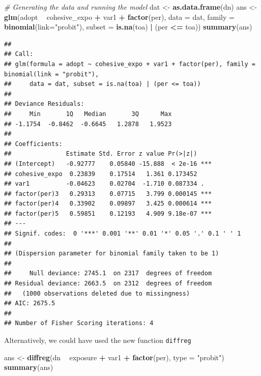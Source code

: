 \documentclass[]{book}
\newenvironment{Shaded}{\begin{snugshade}}{\end{snugshade}}
\newcommand{\CommentTok}[1]{\textcolor[rgb]{0.56,0.35,0.01}{\textit{#1}}}
\newcommand{\DataTypeTok}[1]{\textcolor[rgb]{0.13,0.29,0.53}{#1}}
\newcommand{\KeywordTok}[1]{\textcolor[rgb]{0.13,0.29,0.53}{\textbf{#1}}}
\newcommand{\NormalTok}[1]{#1}
\newcommand{\OperatorTok}[1]{\textcolor[rgb]{0.81,0.36,0.00}{\textbf{#1}}}
\newcommand{\StringTok}[1]{\textcolor[rgb]{0.31,0.60,0.02}{#1}}
\begin{document}
\begin{itemize}
\begin{Shaded}
\begin{Highlighting}[]
\CommentTok{# Generating the data and running the model}
\NormalTok{dat <-}\StringTok{ }\KeywordTok{as.data.frame}\NormalTok{(dn)}
\NormalTok{ans <-}\StringTok{ }\KeywordTok{glm}\NormalTok{(adopt }\OperatorTok{~}\StringTok{ }\NormalTok{cohesive_expo }\OperatorTok{+}\StringTok{ }\NormalTok{var1 }\OperatorTok{+}\StringTok{ }\KeywordTok{factor}\NormalTok{(per),}
           \DataTypeTok{data =}\NormalTok{ dat,}
           \DataTypeTok{family =} \KeywordTok{binomial}\NormalTok{(}\DataTypeTok{link=}\StringTok{"probit"}\NormalTok{),}
           \DataTypeTok{subset =} \KeywordTok{is.na}\NormalTok{(toa) }\OperatorTok{|}\StringTok{ }\NormalTok{(per }\OperatorTok{<=}\StringTok{ }\NormalTok{toa))}
\KeywordTok{summary}\NormalTok{(ans)}
\end{Highlighting}
\end{Shaded}

\begin{verbatim}
## 
## Call:
## glm(formula = adopt ~ cohesive_expo + var1 + factor(per), family = binomial(link = "probit"), 
##     data = dat, subset = is.na(toa) | (per <= toa))
## 
## Deviance Residuals: 
##     Min       1Q   Median       3Q      Max  
## -1.1754  -0.8462  -0.6645   1.2878   1.9523  
## 
## Coefficients:
##               Estimate Std. Error z value Pr(>|z|)    
## (Intercept)   -0.92777    0.05840 -15.888  < 2e-16 ***
## cohesive_expo  0.23839    0.17514   1.361 0.173452    
## var1          -0.04623    0.02704  -1.710 0.087334 .  
## factor(per)3   0.29313    0.07715   3.799 0.000145 ***
## factor(per)4   0.33902    0.09897   3.425 0.000614 ***
## factor(per)5   0.59851    0.12193   4.909 9.18e-07 ***
## ---
## Signif. codes:  0 '***' 0.001 '**' 0.01 '*' 0.05 '.' 0.1 ' ' 1
## 
## (Dispersion parameter for binomial family taken to be 1)
## 
##     Null deviance: 2745.1  on 2317  degrees of freedom
## Residual deviance: 2663.5  on 2312  degrees of freedom
##   (1000 observations deleted due to missingness)
## AIC: 2675.5
## 
## Number of Fisher Scoring iterations: 4
\end{verbatim}

  Alternatively, we could have used the new function \texttt{diffreg}

\begin{Shaded}
\begin{Highlighting}[]
\NormalTok{ans <-}\StringTok{ }\KeywordTok{diffreg}\NormalTok{(dn }\OperatorTok{~}\StringTok{ }\NormalTok{exposure }\OperatorTok{+}\StringTok{ }\NormalTok{var1 }\OperatorTok{+}\StringTok{ }\KeywordTok{factor}\NormalTok{(per), }\DataTypeTok{type =} \StringTok{"probit"}\NormalTok{)}
\KeywordTok{summary}\NormalTok{(ans)}
\end{Highlighting}
\end{Shaded}


\end{itemize}
\end{document}
